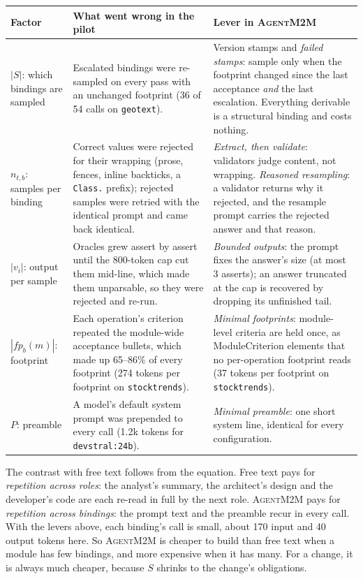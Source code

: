 \documentclass[10pt,a4paper]{article}
\newcommand{\tool}{\textsc{AgentM2M}}
\newcommand{\fp}{\mathit{fp}}
\newcommand{\cls}[1]{\textsf{#1}}
\newcommand{\code}[1]{\texttt{#1}}
\theoremstyle{definition}
\begin{document}
\begin{center}\small
\begin{tabularx}{\textwidth}{@{}l X X@{}}
\toprule
Factor & What went wrong in the pilot & Lever in \tool{} \\
\midrule
$|S|$: which bindings are sampled & Escalated bindings were re-sampled on every pass with an unchanged footprint (36 of 54 calls on \texttt{geotext}). & Version stamps and \emph{failed stamps}: sample only when the footprint changed since the last acceptance \emph{and} the last escalation. Everything derivable is a structural binding and costs nothing. \\
$n_{t,b}$: samples per binding & Correct values were rejected for their wrapping (prose, fences, inline backticks, a \code{Class.} prefix); rejected samples were retried with the identical prompt and came back identical. & \emph{Extract, then validate}: validators judge content, not wrapping. \emph{Reasoned resampling}: a validator returns why it rejected, and the resample prompt carries the rejected answer and that reason. \\
$|v_i|$: output per sample & Oracles grew assert by assert until the 800-token cap cut them mid-line, which made them unparsable, so they were rejected and re-run. & \emph{Bounded outputs}: the prompt fixes the answer's size (at most 3 asserts); an answer truncated at the cap is recovered by dropping its unfinished tail. \\
$|\fp_b(m)|$: footprint & Each operation's criterion repeated the module-wide acceptance bullets, which made up 65--86\% of every footprint (274 tokens per footprint on \texttt{stocktrends}). & \emph{Minimal footprints}: module-level criteria are held once, as \cls{ModuleCriterion} elements that no per-operation footprint reads (37 tokens per footprint on \texttt{stocktrends}). \\
$P$: preamble & A model's default system prompt was prepended to every call (1.2k tokens for \texttt{devstral:24b}). & \emph{Minimal preamble}: one short system line, identical for every configuration. \\
\bottomrule
\end{tabularx}
\end{center}

\noindent The contrast with free text follows from the equation. Free text
pays for \emph{repetition across roles}: the analyst's summary, the
architect's design and the developer's code are each re-read in full by the
next role. \tool{} pays for \emph{repetition across bindings}: the prompt
text and the preamble recur in every call. With the levers above, each
binding's call is small, about 170 input and 40 output tokens here. So
\tool{} is cheaper to build than free text when a module has few bindings,
and more expensive when it has many. For a change, it is always much
cheaper, because $S$ shrinks to the change's obligations.
\end{document}
